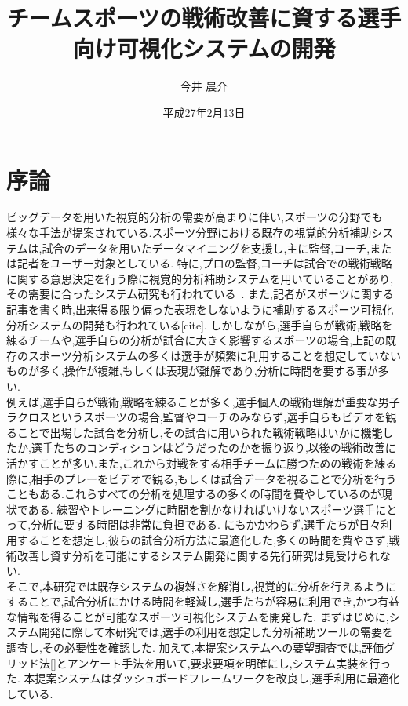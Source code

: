 \documentclass[sotsuron]{kuee}
\title{チームスポーツの戦術改善に資する選手向け可視化システムの開発}
\author{今井 晨介}
\date{平成27年2月13日}
\begin{document}
\maketitle	
\tableofcontents


\chapter{序論}
	ビッグデータを用いた視覚的分析の需要が高まりに伴い,スポーツの分野でも様々な手法が提案されている.スポーツ分野における既存の視覚的分析補助システムは,試合のデータを用いたデータマイニングを支援し,主に監督,コーチ,または記者をユーザー対象としている.
	特に,プロの監督,コーチは試合での戦術戦略に関する意思決定を行う際に視覚的分析補助システムを用いていることがあり,その需要に合ったシステム研究も行われている~\cite{Perin2013}.
	また,記者がスポーツに関する記事を書く時,出来得る限り偏った表現をしないように補助するスポーツ可視化分析システムの開発も行われている[cite].
	しかしながら,選手自らが戦術,戦略を練るチームや,選手自らの分析が試合に大きく影響するスポーツの場合,上記の既存のスポーツ分析システムの多くは選手が頻繁に利用することを想定していないものが多く,操作が複雑,もしくは表現が難解であり,分析に時間を要する事が多い.
	\\例えば,選手自らが戦術,戦略を練ることが多く,選手個人の戦術理解が重要な男子ラクロスというスポーツの場合,監督やコーチのみならず,選手自らもビデオを観ることで出場した試合を分析し,その試合に用いられた戦術戦略はいかに機能したか,選手たちのコンディションはどうだったのかを振り返り,以後の戦術改善に活かすことが多い.また,これから対戦をする相手チームに勝つための戦術を練る際に,相手のプレーをビデオで観る,もしくは試合データを視ることで分析を行うこともある.これらすべての分析を処理するの多くの時間を費やしているのが現状である.
	練習やトレーニングに時間を割かなければいけないスポーツ選手にとって,分析に要する時間は非常に負担である.
	にもかかわらず,選手たちが日々利用することを想定し,彼らの試合分析方法に最適化した,多くの時間を費やさず,戦術改善し資す分析を可能にするシステム開発に関する先行研究は見受けられない.
	\\そこで,本研究では既存システムの複雑さを解消し,視覚的に分析を行えるようにすることで,試合分析にかける時間を軽減し,選手たちが容易に利用でき,かつ有益な情報を得ることが可能なスポーツ可視化システムを開発した.
	まずはじめに,システム開発に際して本研究では,選手の利用を想定した分析補助ツールの需要を調査し,その必要性を確認した.
	加えて,本提案システムへの要望調査では,評価グリッド法[]とアンケート手法を用いて,要求要項を明確にし,システム実装を行った.
	本提案システムはダッシュボードフレームワークを改良し,選手利用に最適化している.
\end{document}
